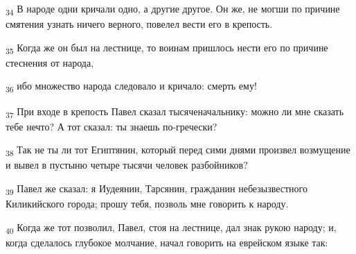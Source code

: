 \begin{tcolorbox}
\textsubscript{34} В народе одни кричали одно, а другие другое. Он же, не могши по причине смятения узнать ничего верного, повелел вести его в крепость.
\end{tcolorbox}
\begin{tcolorbox}
\textsubscript{35} Когда же он был на лестнице, то воинам пришлось нести его по причине стеснения от народа,
\end{tcolorbox}
\begin{tcolorbox}
\textsubscript{36} ибо множество народа следовало и кричало: смерть ему!
\end{tcolorbox}
\begin{tcolorbox}
\textsubscript{37} При входе в крепость Павел сказал тысяченачальнику: можно ли мне сказать тебе нечто? А тот сказал: ты знаешь по-гречески?
\end{tcolorbox}
\begin{tcolorbox}
\textsubscript{38} Так не ты ли тот Египтянин, который перед сими днями произвел возмущение и вывел в пустыню четыре тысячи человек разбойников?
\end{tcolorbox}
\begin{tcolorbox}
\textsubscript{39} Павел же сказал: я Иудеянин, Тарсянин, гражданин небезызвестного Киликийского города; прошу тебя, позволь мне говорить к народу.
\end{tcolorbox}
\begin{tcolorbox}
\textsubscript{40} Когда же тот позволил, Павел, стоя на лестнице, дал знак рукою народу; и, когда сделалось глубокое молчание, начал говорить на еврейском языке так:
\end{tcolorbox}

